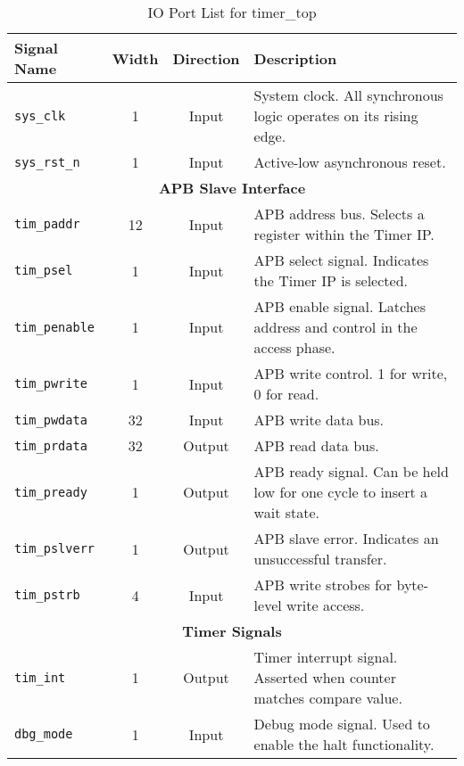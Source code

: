 \documentclass[11pt, a4paper]{article}
\begin{document}
\begin{table}[H]
    \centering
    \caption{IO Port List for timer\_top}
    \label{tab:io_ports}
    \begin{tabular}{@{}lccl@{}}
        \toprule
        \textbf{Signal Name} & \textbf{Width} & \textbf{Direction} & \textbf{Description} \\ \midrule
        \texttt{sys\_clk}      & 1              & Input              & System clock. All synchronous logic operates on its rising edge. \\
        \texttt{sys\_rst\_n}    & 1              & Input              & Active-low asynchronous reset. \\
        \multicolumn{4}{c}{\textbf{APB Slave Interface}} \\
        \texttt{tim\_paddr}    & 12             & Input              & APB address bus. Selects a register within the Timer IP. \\
        \texttt{tim\_psel}     & 1              & Input              & APB select signal. Indicates the Timer IP is selected. \\
        \texttt{tim\_penable}  & 1              & Input              & APB enable signal. Latches address and control in the access phase. \\
        \texttt{tim\_pwrite}   & 1              & Input              & APB write control. 1 for write, 0 for read. \\
        \texttt{tim\_pwdata}   & 32             & Input              & APB write data bus. \\
        \texttt{tim\_prdata}   & 32             & Output             & APB read data bus. \\
        \texttt{tim\_pready}   & 1              & Output             & APB ready signal. Can be held low for one cycle to insert a wait state. \\
        \texttt{tim\_pslverr}  & 1              & Output             & APB slave error. Indicates an unsuccessful transfer. \\
        \texttt{tim\_pstrb}    & 4              & Input              & APB write strobes for byte-level write access. \\
        \multicolumn{4}{c}{\textbf{Timer Signals}} \\
        \texttt{tim\_int}      & 1              & Output             & Timer interrupt signal. Asserted when counter matches compare value. \\
        \texttt{dbg\_mode}     & 1              & Input              & Debug mode signal. Used to enable the halt functionality. \\ \bottomrule
    \end{tabular}
\end{table}
\end{document}
